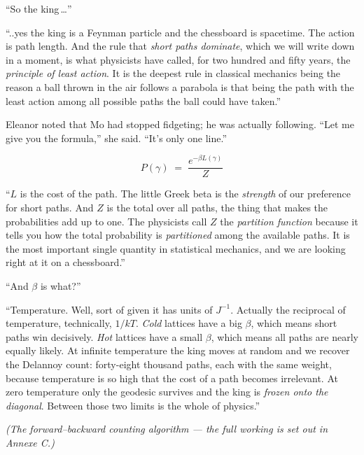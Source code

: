 ``So the king\,\ldots''
 
``..yes the king is a Feynman particle and the chessboard is spacetime. The action is path length. And the rule that \emph{short paths dominate}, which we will write down in a moment, is what physicists
have called, for two hundred and fifty years, the \emph{principle of
least action}. It is the deepest rule in classical mechanics being the
reason a ball thrown in the air follows a parabola is that being the path with the least action among all possible paths
the ball could have taken.''
 
Eleanor noted that Mo had stopped fidgeting; he was actually following. ``Let me give you the formula,'' she said. ``It's only one line.''
 
\[
  P(\gamma) \;=\; \frac{e^{-\beta L(\gamma)}}{Z}
\]
 
``$L$ is the cost of the path. The little Greek beta is the
\emph{strength} of our preference for short paths. And $Z$ is the
total over all paths, the thing that makes the probabilities add up
to one. The physicists call $Z$ the \emph{partition function}
because it tells you how the total probability is
\emph{partitioned} among the available paths. It is the most
important single quantity in statistical mechanics, and we are
looking right at it on a chessboard.''
 
``And $\beta$ is what?''
 
``Temperature. Well, sort of given it has units of $J^{-1}$. Actually the reciprocal of temperature, technically, \(1/{kT}\).
\emph{Cold} lattices have a big $\beta$, which means short paths win
decisively. \emph{Hot} lattices have a small $\beta$, which means all paths are nearly equally likely. At infinite temperature the king moves at random and we recover the Delannoy count: forty-eight thousand paths, each with the same weight, because temperature is
so high that the cost of a path becomes irrelevant. At zero temperature only the geodesic survives and the king is \emph{frozen onto the diagonal}. Between those two limits is the whole of physics.''
 
\textit{(The forward–backward counting algorithm --- the full working is set out in Annexe C.)}

